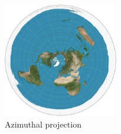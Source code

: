 \begin{figure}[!htb]
\centering
\includegraphics[height=5cm,keepaspectratio]{images/methods/projections/azimuthal.jpg}
\caption[
    Azimuthal projection, Urldate: 07.2016 \newline
    \small\texttt{\url{https://upload.wikimedia.org/wikipedia/commons/e/ec/Azimuthal_equidistant_projection_SW.jpg}}.
]{Azimuthal projection}
\label{fig:projections-azimuthal}
\end{figure}